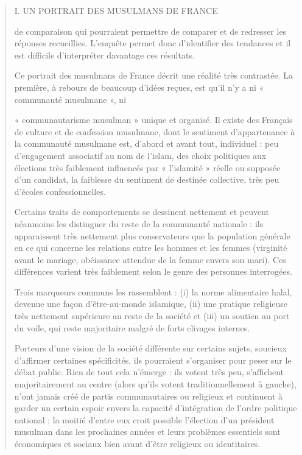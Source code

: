 \begin{quote}
I. UN PORTRAIT DES MUSULMANS DE FRANCE

de comparaison qui pourraient permettre de comparer et de redresser les
réponses recueillies. L'enquête permet donc d'identifier des tendances
et il est difficile d'interpréter davantage ces résultats.

Ce portrait des musulmans de France décrit une réalité très contrastée.
La première, à rebours de beaucoup d'idées reçues, est qu'il n'y a ni «
communauté musulmane », ni

« communautarisme musulman » unique et organisé. Il existe des Français
de culture et de confession musulmane, dont le sentiment d'appartenance
à la communauté musulmane est, d'abord et avant tout, individuel : peu
d'engagement associatif au nom de l'islam, des choix politiques aux
élections très faiblement influencés par « l'islamité » réelle ou
supposée d'un candidat, la faiblesse du sentiment de destinée
collective, très peu d'écoles confessionnelles.

Certains traits de comportements se dessinent nettement et peuvent
néanmoins les distinguer du reste de la communauté nationale : ils
apparaissent très nettement plus conservateurs que la population
générale en ce qui concerne les relations entre les hommes et les femmes
(virginité avant le mariage, obéissance attendue de la femme envers son
mari). Ces différences varient très faiblement selon le genre des
personnes interrogées.

Trois marqueurs communs les rassemblent : (i) la norme alimentaire
halal, devenue une façon d'être-au-monde islamique, (ii) une pratique
religieuse très nettement supérieure au reste de la société et (iii) un
soutien au port du voile, qui reste majoritaire malgré de forts clivages
internes.

Porteurs d'une vision de la société différente sur certains sujets,
soucieux d'affirmer certaines spécificités, ils pourraient s'organiser
pour peser sur le débat public. Rien de tout cela n'émerge : ils votent
très peu, s'affichent majoritairement au centre (alors qu'ils votent
traditionnellement à gauche), n'ont jamais créé de partis communautaires
ou religieux et continuent à garder un certain espoir envers la capacité
d'intégration de l'ordre politique national ; la moitié d'entre eux
croit possible l'élection d'un président musulman dans les prochaines
années et leurs problèmes essentiels sont économiques et sociaux bien
avant d'être religieux ou identitaires.


\end{quote}
